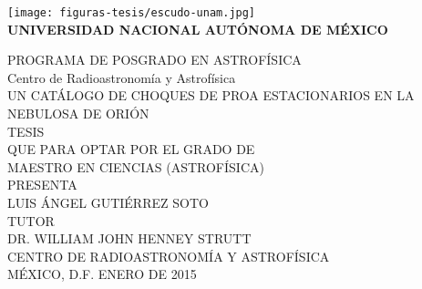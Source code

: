 \begin{center}
\texttt{[image: figuras-tesis/escudo-unam.jpg]}
\\[0.6cm]

\textbf{UNIVERSIDAD NACIONAL AUT\'ONOMA DE M\'EXICO}


 PROGRAMA DE POSGRADO EN ASTROF\'ISICA
\\[0.8cm]

Centro de Radioastronom\'ia y Astrof\'isica
\\[2.5cm]

UN CATÁLOGO DE CHOQUES DE PROA ESTACIONARIOS EN LA NEBULOSA DE ORIÓN
\\[2cm]

TESIS\\
QUE PARA OPTAR POR EL GRADO DE\\ 
MAESTRO EN CIENCIAS (ASTROFÍSICA)
\\[1.5cm]

PRESENTA
\\

LUIS ÁNGEL GUTIÉRREZ SOTO
\\[1.5cm]

TUTOR
\\

DR. WILLIAM JOHN HENNEY STRUTT\\ 
CENTRO DE RADIOASTRONOMÍA Y ASTROFÍSICA
\\[1.5cm]


M\'EXICO, D.F. ENERO DE 2015
\end{center} 

